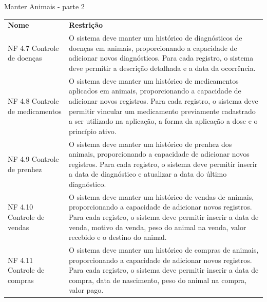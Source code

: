 \begin{tabframed}[!htb]
  \caption{Manter Animais - parte 2}
  \label{quad:requisitoManterAnimaisParte2}
  \renewcommand{\arraystretch}{1.5}
  \begin{tabular}{|l|l|}
    \cline{1-2}

    \textbf{Nome}                                                           &
    \textbf{Restrição}
    \\ \cline{1-2}

    \multicolumn{1}{|p{3cm}|}{\raggedright NF 4.7 Controle de doenças}      &
    \multicolumn{1}{|p{12cm}|}{\raggedright O sistema deve manter um histórico de diagnósticos de doenças em animais, proporcionando a capacidade de adicionar novos diagnósticos. Para cada registro, o sistema deve permitir a descrição detalhada e a data da ocorrência.}
    \\ \cline{1-2}

    \multicolumn{1}{|p{3cm}|}{\raggedright NF 4.8 Controle de medicamentos} &
    \multicolumn{1}{|p{12cm}|}{\raggedright O sistema deve manter um histórico de medicamentos aplicados em animais, proporcionando a capacidade de adicionar novos registros. Para cada registro, o sistema deve permitir vincular um medicamento previamente cadastrado a ser utilizado na aplicação, a forma da aplicação a dose e o princípio ativo.}
    \\ \cline{1-2}

    \multicolumn{1}{|p{3cm}|}{\raggedright NF 4.9 Controle de prenhez}     &
    \multicolumn{1}{|p{12cm}|}{\raggedright O sistema deve manter um histórico de prenhez dos animais, proporcionando a capacidade de adicionar novos registros. Para cada registro, o sistema deve permitir inserir a data de diagnóstico e atualizar a data do último diagnóstico.}
    \\ \cline{1-2}

    \multicolumn{1}{|p{3cm}|}{\raggedright NF 4.10 Controle de vendas }     &
    \multicolumn{1}{|p{12cm}|}{\raggedright O sistema deve manter um histórico de vendas de animais, proporcionando a capacidade de adicionar novos registros. Para cada registro, o sistema deve permitir inserir a data de venda, motivo da venda, peso do animal na venda, valor recebido e o destino do animal.}
    \\ \cline{1-2}

    \multicolumn{1}{|p{3cm}|}{\raggedright NF 4.11 Controle de compras}     &
    \multicolumn{1}{|p{12cm}|}{\raggedright O sistema deve manter um histórico de compras de animais, proporcionando a capacidade de adicionar novos registros. Para cada registro, o sistema deve permitir inserir a data de compra, data de nascimento, peso do animal na compra, valor pago.}
    \\ \cline{1-2}


\end{tabular}
\end{tabframed}
